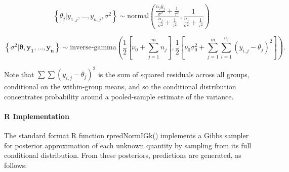 \documentclass[12pt, a4paper]{article}
\begin{document}
      $$\left\{\theta_j|y_{1,j},...,y_{n,j},\sigma^2\right\} \sim \text{normal}\left(\dfrac{\frac{n_j\bar{y}_j}{\sigma^2} + \frac{1}{\tau^2}}{\frac{n_j}{\sigma^2}+\frac{1}{\tau^2}},\dfrac{1}{\frac{n_j}{\sigma^2}+\frac{1}{\tau^2}}\right)$$

      $$\left\{\sigma^2|\mathbf{\theta,y_1,...,y_n}\right\} \sim \text{inverse-gamma}\left(\dfrac{1}{2}\left[\nu_0 + \sum_{j=1}^m n_j\right],\dfrac{1}{2}\left[\nu_0\sigma^2_0 + \sum_{j=1}^m\sum_{i=1}^{n_j}\left(y_{i,j}-\theta_j\right)^2\right]\right).$$

      Note that $\sum\sum\left(y_{i,j}-\theta_j\right)^2$ is the sum of squared residuals across all groups, conditional on the within-group means, and so the conditional distribution concentrates probability around a pooled-sample estimate of the variance.


      \paragraph{R Implementation}

      The standard format R function rpredNormIGk() implements a Gibbs sampler for posterior approximation of each unknown quantity by sampling from its full conditional distribution.  From these posteriors, predictions are generated, as follows:
\end{document}
